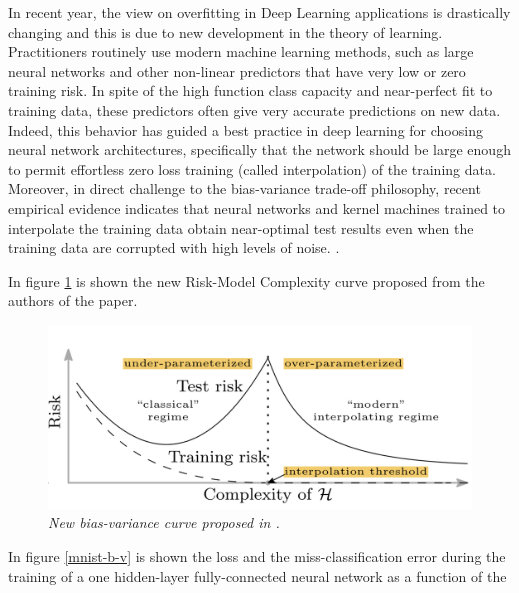 \documentclass[11pt,a4paper]{article}
\begin{document}
In recent year, the view on overfitting in Deep Learning applications is drastically changing and this is due to new development in the theory of learning.
Practitioners routinely use modern machine learning methods, such as large neural networks and other non-linear predictors that have very low or zero training risk. In spite of the high function class capacity and near-perfect fit to training data, these predictors often give very accurate predictions on new data. Indeed, this behavior has guided a best practice in deep learning for choosing neural network architectures, specifically that the network should be large enough to permit effortless zero loss training (called interpolation) of the training data. Moreover, in direct challenge to the bias-variance trade-off philosophy, recent empirical evidence indicates that neural networks and kernel machines trained to interpolate the training data obtain near-optimal test results even when the training data are corrupted with high levels of noise. \cite{doubleU}.

In figure \ref{bias-variance-tradeoff-new} is shown the new Risk-Model Complexity curve proposed from the authors of the paper.

\begin{figure}[H]
 \centering
 \includegraphics[scale=0.4]{../images/new-curve.png}
 \caption{\textit{New bias-variance curve proposed in \cite{doubleU}.}}  
 \label{bias-variance-tradeoff-new}
\end{figure}

In figure \ref{mnist-b-v} is shown the loss and the miss-classification error during the training of a one hidden-layer fully-connected neural network as a function of the
\end{document}
